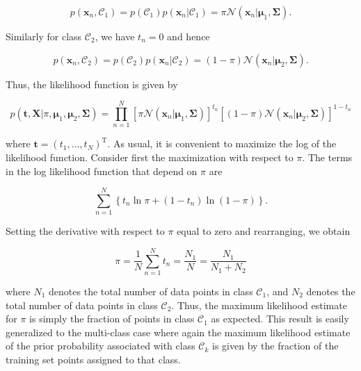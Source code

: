 \documentclass{article}
\begin{document}
\begin{equation}
p(\mathbf{x}_{n},\mathcal{C}_{1})=p(\mathcal{C}_{1})p(\mathbf{x}_{n}|\mathcal{C}_{1})=\pi\mathcal{N}(\mathbf{x}_{n}|\boldsymbol{\mu}_{1},\boldsymbol{\Sigma}).
\end{equation}

Similarly for class $\mathcal{C}_{2}$, we have $t_{n}=0$ and hence

\begin{equation}
p(\mathbf{x}_{n},\mathcal{C}_{2})=p(\mathcal{C}_{2})p(\mathbf{x}_{n}|\mathcal{C}_{2})=(1-\pi)\mathcal{N}(\mathbf{x}_{n}|\boldsymbol{\mu}_{2},\boldsymbol{\Sigma}).
\end{equation}

Thus, the likelihood function is given by

\begin{equation}
p(\mathbf{t},\mathbf{X}|\pi,\boldsymbol{\mu}_{1},\boldsymbol{\mu}_{2},\boldsymbol{\Sigma})=\prod_{n=1}^{N}\left[\pi\mathcal{N}(\mathbf{x}_{n}|\boldsymbol{\mu}_{1},\boldsymbol{\Sigma})\right]^{t_{n}}\left[(1-\pi)\mathcal{N}(\mathbf{x}_{n}|\boldsymbol{\mu}_{2},\boldsymbol{\Sigma})\right]^{1-t_{n}}
\tag{5.54}
\end{equation}

where $\mathbf{t}=(t_{1},\ldots,t_{N})^{\mathrm{T}}$. As usual, it is convenient to maximize the log of the likelihood function. Consider first the maximization with respect to $\pi$. The terms in the log likelihood function that depend on $\pi$ are

\begin{equation}
\sum_{n=1}^{N}\left\{t_{n}\ln\pi+(1-t_{n})\ln(1-\pi)\right\}.
\tag{5.55}
\end{equation}

Setting the derivative with respect to $\pi$ equal to zero and rearranging, we obtain

\begin{equation}
\pi=\frac{1}{N}\sum_{n=1}^{N}t_{n}=\frac{N_{1}}{N}=\frac{N_{1}}{N_{1}+N_{2}}
\tag{5.56}
\end{equation}

where $N_{1}$ denotes the total number of data points in class $\mathcal{C}_{1}$, and $N_{2}$ denotes the total number of data points in class $\mathcal{C}_{2}$. Thus, the maximum likelihood estimate for $\pi$ is simply the fraction of points in class $\mathcal{C}_{1}$ as expected. This result is easily generalized to the multi-class case where again the maximum likelihood estimate of the prior probability associated with class $\mathcal{C}_{k}$ is given by the fraction of the training set points assigned to that class.
\end{document}
